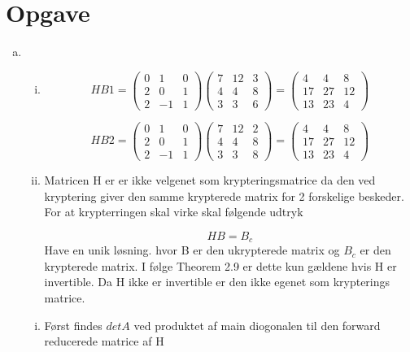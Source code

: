\documentclass[12pt]{article}
\begin{document}
\section{Opgave}
\begin{enumerate}[(a)]
\item

\begin{enumerate}[(i)]
  \item 
$$
HB1 =\left(\begin{array}{ccc}
0&1&0\\
2&0&1\\
2&-1&1
\end{array}\right)\left(\begin{array}{ccc}
7&12&3\\
4&4&8\\
3&3&6
\end{array}\right)=
\left(\begin{array}{ccc}
4&4&8\\
17&27&12\\
13&23&4
\end{array}\right)
$$

$$
HB2 =\left(\begin{array}{ccc}
0&1&0\\
2&0&1\\
2&-1&1
\end{array}\right)
\left(\begin{array}{ccc}
7&12&2\\
4&4&8\\
3&3&8
\end{array}\right)=
\left(\begin{array}{ccc}
4&4&8\\
17&27&12\\
13&23&4
\end{array}\right)
$$
\item
Matricen H er er ikke velgenet som krypteringsmatrice da den ved kryptering
giver den samme krypterede matrix for 2 forskelige beskeder. For at
krypterringen skal virke skal følgende udtryk

$$
HB = B_c
$$
Have en unik løsning. hvor B er den ukrypterede matrix og $B_c$ er den
krypterede matrix.
I følge Theorem 2.9 er dette kun gældene hvis H er invertible. Da H ikke er
invertible er den ikke egenet som krypterings matrice.
\end{enumerate}
\begin{enumerate}[(i)]
\item 
Først findes $detA$ ved produktet af main diogonalen til den forward reducerede
matrice af H


\end{enumerate}
\end{enumerate}
\end{document}
